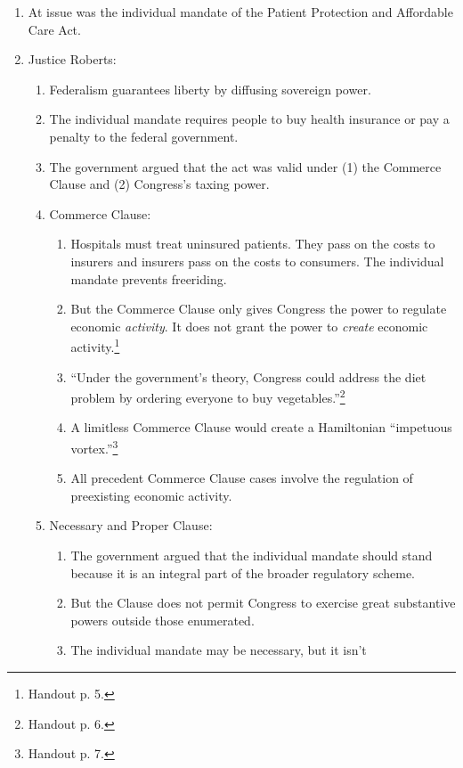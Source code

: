 \begin{enumerate}
    \item At issue was the individual mandate of the Patient Protection and 
    Affordable Care Act.
    \item Justice Roberts:
    \begin{enumerate}
        \item Federalism guarantees liberty by diffusing sovereign power.
        \item The individual mandate requires people to buy health insurance 
        or pay a penalty to the federal government.
        \item The government argued that the act was valid under (1) the 
        Commerce Clause and (2) Congress's taxing power.
        \item Commerce Clause:
        \begin{enumerate}
            \item Hospitals must treat uninsured patients. They pass on the 
            costs to insurers and insurers pass on the costs to consumers. The 
            individual mandate prevents freeriding.
            \item But the Commerce Clause only gives Congress the power to 
            regulate economic \emph{activity}. It does not grant the power to 
            \emph{create} economic activity.\footnote{Handout p. 5.}
            \item ``Under the government's theory, Congress could address the 
            diet problem by ordering everyone to buy 
            vegetables.''\footnote{Handout p. 6.}
            \item A limitless Commerce Clause would create a Hamiltonian 
            ``impetuous vortex.''\footnote{Handout p. 7.}
            \item All precedent Commerce Clause cases involve the regulation 
            of preexisting economic activity.
        \end{enumerate}
        \item Necessary and Proper Clause:
        \begin{enumerate}
            \item The government argued that the individual mandate should 
            stand because it is an integral part of the broader regulatory 
            scheme.
            \item But the Clause does not permit Congress to exercise great 
            substantive powers outside those enumerated.
            \item The individual mandate may be necessary, but it isn't 

\end{enumerate}
\end{enumerate}
\end{enumerate}
